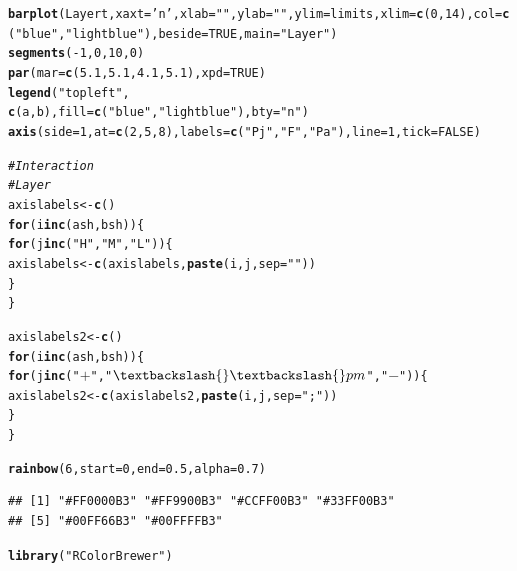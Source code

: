 \documentclass{article}\usepackage[]{graphicx}\usepackage[]{color}
\makeatletter
\newcommand{\hlnum}[1]{\textcolor[rgb]{0.686,0.059,0.569}{#1}}%
\newcommand{\hlstr}[1]{\textcolor[rgb]{0.192,0.494,0.8}{#1}}%
\newcommand{\hlcom}[1]{\textcolor[rgb]{0.678,0.584,0.686}{\textit{#1}}}%
\newcommand{\hlopt}[1]{\textcolor[rgb]{0,0,0}{#1}}%
\newcommand{\hlstd}[1]{\textcolor[rgb]{0.345,0.345,0.345}{#1}}%
\newcommand{\hlkwa}[1]{\textcolor[rgb]{0.161,0.373,0.58}{\textbf{#1}}}%
\newcommand{\hlkwb}[1]{\textcolor[rgb]{0.69,0.353,0.396}{#1}}%
\newcommand{\hlkwc}[1]{\textcolor[rgb]{0.333,0.667,0.333}{#1}}%
\newcommand{\hlkwd}[1]{\textcolor[rgb]{0.737,0.353,0.396}{\textbf{#1}}}%
\newenvironment{kframe}{%
 \def\at@end@of@kframe{}%
 \ifinner\ifhmode%
  \def\at@end@of@kframe{\end{minipage}}%
  \begin{minipage}{\columnwidth}%
 \fi\fi%
 \def\FrameCommand##1{\hskip\@totalleftmargin \hskip-\fboxsep
 \colorbox{shadecolor}{##1}\hskip-\fboxsep
     \hskip-\linewidth \hskip-\@totalleftmargin \hskip\columnwidth}%
 \MakeFramed {\advance\hsize-\width
   \@totalleftmargin\z@ \linewidth\hsize
   \@setminipage}}%
 {\par\unskip\endMakeFramed%
 \at@end@of@kframe}
\newenvironment{knitrout}{}{} %
\makeatother
\begin{document}
\begin{knitrout}
\begin{kframe}
\begin{alltt}
\hlkwd{barplot}\hlstd{(Layert,}\hlkwc{xaxt}\hlstd{=}\hlstr{'n'}\hlstd{,} \hlkwc{xlab}\hlstd{=}\hlstr{""}\hlstd{,} \hlkwc{ylab}\hlstd{=}\hlstr{""}\hlstd{,} \hlkwc{ylim}\hlstd{=limits,} \hlkwc{xlim}\hlstd{=}\hlkwd{c}\hlstd{(}\hlnum{0}\hlstd{,}\hlnum{14}\hlstd{),} \hlkwc{col}\hlstd{=}\hlkwd{c}\hlstd{(}\hlstr{"blue"}\hlstd{,}\hlstr{"lightblue"}\hlstd{),} \hlkwc{beside}\hlstd{=}\hlnum{TRUE}\hlstd{,} \hlkwc{main}\hlstd{=}\hlstr{"Layer"}\hlstd{)}
\hlkwd{segments}\hlstd{(}\hlopt{-}\hlnum{1}\hlstd{,}\hlnum{0}\hlstd{,} \hlnum{10}\hlstd{,}\hlnum{0}\hlstd{)}
\hlkwd{par}\hlstd{(}\hlkwc{mar}\hlstd{=}\hlkwd{c}\hlstd{(}\hlnum{5.1}\hlstd{,} \hlnum{5.1}\hlstd{,} \hlnum{4.1}\hlstd{,} \hlnum{5.1}\hlstd{),} \hlkwc{xpd}\hlstd{=}\hlnum{TRUE}\hlstd{)}
\hlkwd{legend}\hlstd{(}\hlstr{"topleft"}\hlstd{,}
     \hlkwd{c}\hlstd{(a,b),} \hlkwc{fill}\hlstd{=}\hlkwd{c}\hlstd{(}\hlstr{"blue"}\hlstd{,}\hlstr{"lightblue"}\hlstd{),} \hlkwc{bty}\hlstd{=}\hlstr{"n"}\hlstd{)}
\hlkwd{axis}\hlstd{(}\hlkwc{side}\hlstd{=}\hlnum{1}\hlstd{,} \hlkwc{at}\hlstd{=}\hlkwd{c}\hlstd{(}\hlnum{2}\hlstd{,}\hlnum{5}\hlstd{,}\hlnum{8}\hlstd{),} \hlkwc{labels}\hlstd{=}\hlkwd{c}\hlstd{(} \hlstr{"Pj"}\hlstd{,} \hlstr{"F"}\hlstd{,} \hlstr{"Pa"}\hlstd{),} \hlkwc{line}\hlstd{=}\hlnum{1}\hlstd{,} \hlkwc{tick}\hlstd{=}\hlnum{FALSE}\hlstd{)}



\hlcom{#Interaction}
\hlcom{#Layer}
\hlstd{axislabels}\hlkwb{<-}\hlkwd{c}\hlstd{()}
\hlkwa{for}\hlstd{(i} \hlkwa{in} \hlkwd{c}\hlstd{(ash,bsh))\{}
  \hlkwa{for}\hlstd{(j} \hlkwa{in} \hlkwd{c}\hlstd{(}\hlstr{"H"}\hlstd{,}\hlstr{"M"}\hlstd{,}\hlstr{"L"}\hlstd{))\{}
    \hlstd{axislabels}\hlkwb{<-}\hlkwd{c}\hlstd{(axislabels,}\hlkwd{paste}\hlstd{(i,j,}\hlkwc{sep}\hlstd{=}\hlstr{""}\hlstd{))}
  \hlstd{\}}
\hlstd{\}}

\hlstd{axislabels2}\hlkwb{<-}\hlkwd{c}\hlstd{()}
\hlkwa{for}\hlstd{(i} \hlkwa{in} \hlkwd{c}\hlstd{(ash,bsh))\{}
  \hlkwa{for}\hlstd{(j} \hlkwa{in} \hlkwd{c}\hlstd{(}\hlstr{"$+$"}\hlstd{,}\hlstr{"$\textbackslash{}\textbackslash{}pm$"}\hlstd{,}\hlstr{"$-$"}\hlstd{))\{}
    \hlstd{axislabels2}\hlkwb{<-}\hlkwd{c}\hlstd{(axislabels2,}\hlkwd{paste}\hlstd{(i,j,}\hlkwc{sep}\hlstd{=}\hlstr{"; "}\hlstd{))}
  \hlstd{\}}
\hlstd{\}}


\hlkwd{rainbow}\hlstd{(}\hlnum{6}\hlstd{,}\hlkwc{start} \hlstd{=} \hlnum{0}\hlstd{,} \hlkwc{end} \hlstd{=} \hlnum{0.5}\hlstd{,} \hlkwc{alpha} \hlstd{=} \hlnum{0.7}\hlstd{)}
\end{alltt}
\begin{verbatim}
## [1] "#FF0000B3" "#FF9900B3" "#CCFF00B3" "#33FF00B3"
## [5] "#00FF66B3" "#00FFFFB3"
\end{verbatim}
\begin{alltt}
\hlkwd{library}\hlstd{(}\hlstr{"RColorBrewer"}\hlstd{)}


\end{alltt}
\end{kframe}
\end{knitrout}
\end{document}
